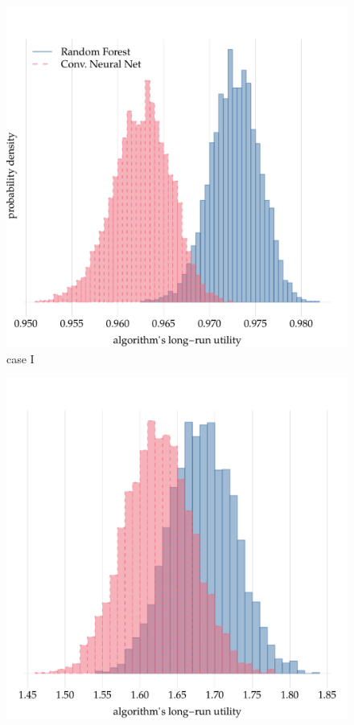 \documentclass[\ifafour a4paper,12pt,\else a5paper,10pt,\fi%
onecolumn,oneside,article,%
british%
]{memoir}
\theoremstyle{remark}
\theoremstyle{innote}
\renewcommand*{\|}[1][]{\nonscript\:#1\vert\nonscript\:\mathopen{}}
\begin{document}
\begin{figure}[!p]
  \centering
  \parbox{0.495\linewidth}{\centering
    \includegraphics[width=\linewidth]{histogram_alg_utilities_1.pdf}
   \\\footnotesize case I}%
  \hfill
  \parbox{0.495\linewidth}{\centering
    \includegraphics[width=\linewidth]{histogram_alg_utilities_2.pdf}
}
\end{figure}
\end{document}
